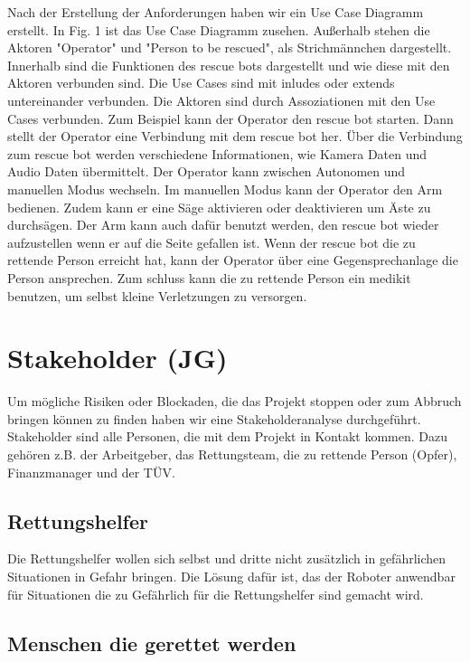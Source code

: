 \documentclass[conference]{IEEEtran}
\begin{document}
Nach der Erstellung der Anforderungen haben wir ein Use Case Diagramm erstellt.\newline 
In Fig. 1 ist das Use Case Diagramm zusehen. Außerhalb stehen die Aktoren "Operator" und "Person to be rescued", als Strichmännchen dargestellt. Innerhalb sind die Funktionen des rescue bots dargestellt und wie diese mit den Aktoren verbunden sind. Die Use Cases sind mit inludes oder extends untereinander verbunden. Die Aktoren sind durch Assoziationen mit den Use Cases verbunden. Zum Beispiel kann der Operator den rescue bot starten. Dann stellt der Operator eine Verbindung mit dem rescue bot her. Über die Verbindung zum rescue bot werden verschiedene Informationen, wie Kamera Daten und Audio Daten übermittelt. Der Operator kann zwischen Autonomen und manuellen Modus wechseln. Im manuellen Modus kann der Operator den Arm bedienen. Zudem kann er eine Säge aktivieren oder deaktivieren um Äste zu durchsägen.
Der Arm kann auch dafür benutzt werden, den rescue bot wieder aufzustellen wenn er auf die Seite gefallen ist.
Wenn der rescue bot die zu rettende Person erreicht hat, kann der Operator über eine Gegensprechanlage die Person ansprechen. Zum schluss kann die zu rettende Person ein medikit benutzen, um selbst kleine Verletzungen zu versorgen.




\section{Stakeholder (JG)}
Um mögliche Risiken oder Blockaden, die das Projekt stoppen oder zum Abbruch bringen können zu finden haben wir eine Stakeholderanalyse durchgeführt. Stakeholder sind alle Personen, die mit dem Projekt in Kontakt kommen. Dazu gehören z.B. der Arbeitgeber, das Rettungsteam, die zu rettende Person (Opfer), Finanzmanager und der TÜV.
\\


\subsection{Rettungshelfer}
Die Rettungshelfer wollen sich selbst und dritte nicht zusätzlich in gefährlichen Situationen in Gefahr bringen.
Die Lösung dafür ist, das der Roboter anwendbar für Situationen die zu Gefährlich für die Rettungshelfer sind gemacht wird.

\subsection{Menschen die gerettet werden}
\end{document}
